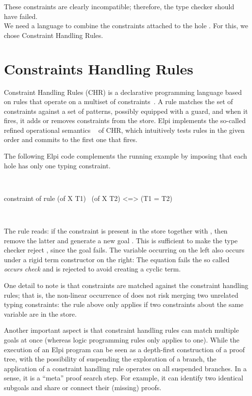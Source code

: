 \documentclass[a4paper, 11pt]{book}
\newenvironment{elpicode}
  {\VerbatimEnvironment~\\\begin{elpibox}\begin{xelpicode}}{\end{xelpicode}
\end{elpibox}\\}
\begin{document}
These constraints are clearly incompatible; therefore, the type checker
should have failed.
~\\

We need a language to combine the constraints attached to the hole
. For this, we chose Constraint Handling Rules.

\section{Constraints Handling Rules}\label{sec:chrui}


Constraint Handling Rules (CHR) is a declarative programming language based
on rules that operate on a multiset of constraints~\cite{chr}. A rule matches
the set of constraints against a set of patterns, possibly equipped with a
guard, and when it fires, it adds or removes constraints from the store.
Elpi implements the so-called refined operational semantics
~\cite{10.1007/978-3-540-27775-0_7} of CHR, which intuitively tests rules in
the given order and commits to the first one that fires.

The following Elpi code complements the running example by imposing that each
hole has only one typing constraint.

\begin{elpicode}
constraint of {
  rule (of X T1) \ (of X T2) <=> (T1 = T2)
}
\end{elpicode}


The rule reads: if the constraint  is present in the store
together with , then remove the latter and generate a new goal
. This is sufficient to make the type checker reject
, since the goal  fails.
The variable  occurring on the left also
occurs under a rigid term constructor  on the right:
The equation fails the so called \emph{occurs check} and is rejected
to avoid creating a cyclic term.

One detail to note is that constraints are matched against the constraint
handling rules; that is, the non-linear occurrence of  does not risk
merging two unrelated typing constraints: the rule above only applies if two
constraints about the same variable are in the store.

Another important aspect is that constraint handling rules can match multiple
goals at once (whereas logic programming rules only applies to one). While
the execution of an Elpi program can be seen as a depth-first construction of
a proof tree, with the possibility of suspending the exploration of a branch,
the application of a constraint handling rule operates on all suspended
branches. In a sense, it is a ``meta'' proof search step. For example, it can
identify two identical subgoals and share or connect their (missing) proofs.
\end{document}
